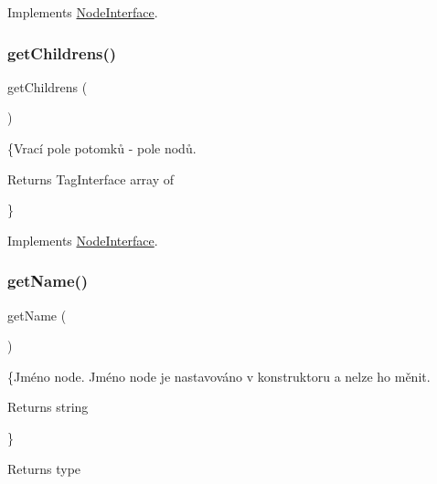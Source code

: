 Implements \mbox{\hyperlink{interface_pes_1_1_dom_1_1_node_1_1_node_interface_a4722e7722b245351681b05d35f6694f3}{Node\+Interface}}.

\mbox{\label{class_pes_1_1_dom_1_1_node_1_1_node_abstract_a97634dc0a1d163eb272a73543accaa92}} 
\subsubsection{\texorpdfstring{get\+Childrens()}{getChildrens()}}
{\footnotesize\ttfamily get\+Childrens (\begin{DoxyParamCaption}{ }\end{DoxyParamCaption})}

\{Vrací pole potomků -\/ pole nodů. \begin{DoxyReturn}{Returns}
Tag\+Interface array of
\end{DoxyReturn}
\} 

Implements \mbox{\hyperlink{interface_pes_1_1_dom_1_1_node_1_1_node_interface_a97634dc0a1d163eb272a73543accaa92}{Node\+Interface}}.

\mbox{\label{class_pes_1_1_dom_1_1_node_1_1_node_abstract_a3d0963e68bb313b163a73f2803c64600}} 
\subsubsection{\texorpdfstring{get\+Name()}{getName()}}
{\footnotesize\ttfamily get\+Name (\begin{DoxyParamCaption}{ }\end{DoxyParamCaption})}

\{Jméno node. Jméno node je nastavováno v konstruktoru a nelze ho měnit.

\begin{DoxyReturn}{Returns}
string
\end{DoxyReturn}
\} \begin{DoxyReturn}{Returns}
type 
\end{DoxyReturn}


